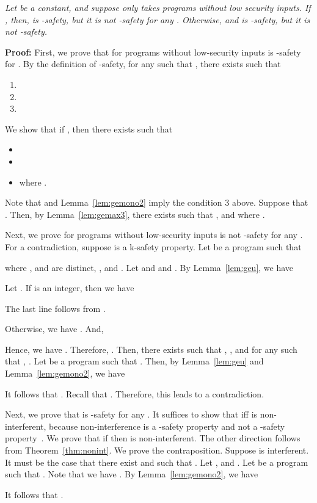 \documentclass{llncs}
\newenvironment{proof}{\noindent\rm{\bf Proof:}}{\hbox{}\vspace*{0.2\baselineskip}}
\newenvironment{reftheorem}[1]{\begin{trivlist}\item[\hskip
      \labelsep{\bf Theorem #1.}]\it}{\end{trivlist}}
\begin{document}
\begin{reftheorem}{\ref{thm:gek}}
  Let  be a constant, and suppose  only takes
  programs without low security inputs.  If , then,
   is -safety, but it is not -safety for
  any .  Otherwise,  and 
  is -safety, but it is not -safety.
\end{reftheorem}
\begin{proof}
  First, we prove that  for programs without
  low-security inputs is -safety for .  By the definition of -safety, for any  such
  that , there exists  such that
\begin{enumerate}
\item 
\item 
\item 
\end{enumerate}
We show that if , then there exists  such
that
\begin{itemize}
\item 
\item 
\item  where .
\end{itemize}
Note that  and Lemma~\ref{lem:gemono2} imply the
condition 3 above.  Suppose that .  Then, by
Lemma~\ref{lem:gemax3}, there exists  such
that , and  where .

Next, we prove  for programs without low-security inputs
is not -safety for any .  For a contradiction,
suppose  is a k-safety property.  Let  be a program
such that

where , and  are distinct,
, and .  Let
 and and
.  By Lemma~\ref{lem:geu}, we
have

Let .  If  is an integer, then we have

The last line follows from .

Otherwise, we have .  And,

Hence, we have .  Therefore, .  Then,
there exists  such that , , and
for any  such that , .  Let  be a program such that .
Then, by Lemma~\ref{lem:geu} and Lemma~\ref{lem:gemono2}, we have

It follows that .  Recall that
.  Therefore, this leads to a
contradiction.

Next, we prove that  is -safety for any
.  It suffices to show that  iff
 is non-interferent, because non-interference is a -safety
property and not a -safety
property~\cite{mclean:sp94,barthe:csfw04,darvas:spc05}.  We prove that
if  then  is non-interferent.  The other
direction follows from Theorem~\ref{thm:nonint}.  We prove the
contraposition.  Suppose  is interferent.  It must be the case that
there exist  and  such that .  Let ,
and .  Let  be a program such that
.  Note that we have
.  By Lemma~\ref{lem:gemono2}, we
have

It follows that .
\end{proof}
\end{document}
